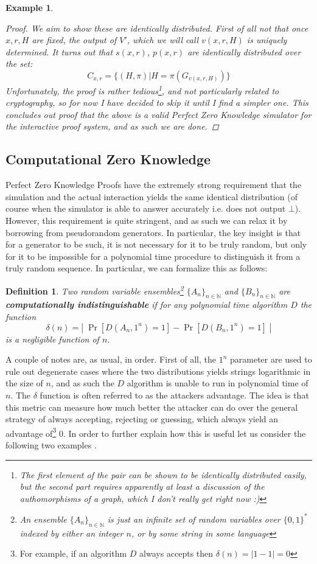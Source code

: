 \documentclass{article}
\newtheorem{definition}{Definition}
\newtheorem{example}{Example}
\begin{document}
\begin{example}
\begin{proof}
        We aim to show these are identically distributed. First of all not that once $x,r,H$ are fixed, the output of $V'$, which we will call $v(x,r,H)$ is uniquely determined.
        It turns out that $s(x,r)$, $p(x,r)$ are identically distributed over the set:
        \[ C_{x,r} = \{ (H, \pi) | H = \pi(G_{v(x,r,H)}) \} \]
        Unfortunately, the proof is rather tedious\footnote{The first element of the pair can be shown to be identically distributed easily, but the second part requires apparently at least a discussion of the authomorphisms of a graph, which I don't really get right now :)}, and not particularly related to cryptography, so for now I have decided to skip it until I find a simpler one.
        This concludes out proof that the above is a valid Perfect Zero Knowledge simulator for the interactive proof system, and as such we are done.
        \end{proof}
\end{example}

\subsection{Computational Zero Knowledge}
Perfect Zero Knowledge Proofs have the extremely strong requirement that the simulation and the actual interaction yields the same identical distribution (of course when the simulator is able to answer accurately i.e. does not output $\bot$). However, this requirement is quite stringent, and as such we can relax it by borrowing from pseudorandom generators. In particular, the key insight is that for a generator to be such, it is not necessary for it to be truly random, but only for it to be impossible for a polynomial time procedure to distinguish it from a truly random sequence. In particular, we can formalize this as follows:
\begin{definition}
Two random variable ensembles\footnote{An ensemble $\{A_n\}_{n \in \mathbb{N}}$ is just an infinite set of random variables over $\{0, 1\}^*$ indexed by either an integer $n$, or by some string in some language} $\{A_n\}_{n \in \mathbb{N}}$ and $\{B_n\}_{n \in \mathbb{N}}$ are \textbf{computationally indistinguishable} if for any polynomial time algorithm $D$ the function
\[ \delta(n) = \left| \; \Pr[D(A_n, 1^n) = 1] - \Pr[D(B_n, 1^n) = 1] \;  \right|  \] is a negligible function of $n$.
\end{definition}
A couple of notes are, as usual, in order. First of all, the $1^n$ parameter are used to rule out degenerate cases where the two distributions yields strings logarithmic in the size of $n$, and as such the $D$ algorithm is unable to run in polynomial time of $n$. The $\delta$ function is often referred to as the attackers advantage. The idea is that this metric can measure how much better the attacker can do over the general strategy of always accepting, rejecting or guessing, which always yield an advantage of\footnote{For example, if an algorithm $D$ always accepts then $\delta(n) = |1 - 1| = 0$} 0. 
In order to further explain how this is useful let us consider the following two examples \cite{ProvableSecurityComputational}.
\end{document}
